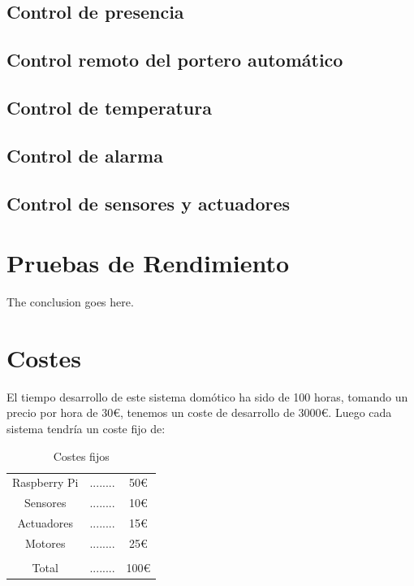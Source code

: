 \documentclass[10pt,journal,compsoc]{IEEEtran}
\begin{document}
\subsection{Control de presencia}

\subsection{Control remoto del portero automático}

\subsection{Control de temperatura}

\subsection{Control de alarma}

\subsection{Control de sensores y actuadores}

\section{Pruebas de Rendimiento}
The conclusion goes here.

\section{Costes}
El tiempo desarrollo de este sistema domótico ha sido de 100 horas, tomando un precio por hora de 30\euro, tenemos un coste de desarrollo de 3000\euro.
Luego cada sistema tendría un coste fijo de:

\begin{table}[h]
\centering
\begin{tabular}{ccc}
Raspberry Pi & ........ & 50\euro \\
Sensores & ........ & 10\euro \\
Actuadores & ........ & 15\euro \\
Motores & ........ & 25\euro \\
\hline \\
Total & ........ & 100\euro \\
\end{tabular} 
\caption{Costes fijos}
\label{tab:CostesFij}
\end{table}
\end{document}
